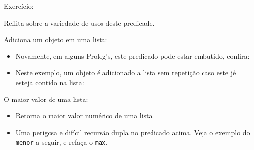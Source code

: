 \documentclass[sans]{beamer}
\begin{document}

\begin{frame}
 \begin{block}{Exercício:}

Reflita sobre a variedade de usos deste predicado.

 \end{block}
\end{frame}


\begin{frame}
\begin{block}{Adiciona um objeto em uma lista:}
\begin{itemize}
 \item Novamente, em alguns Prolog's, este predicado pode estar embutido, confira:
 \item Neste exemplo, um objeto é adicionado a lista
sem repeti\c{c}ão caso este jé
 esteja contido na lista:
\end{itemize}




\end{block}
\end{frame}

\begin{frame}
\begin{block}{O maior valor de uma lista:}
\begin{itemize}
 \item Retorna o maior valor numérico de uma lista.



 \item Uma perigosa e difícil recursão dupla no predicado acima.
Veja o exemplo do \texttt{menor} a seguir, e refaça o \texttt{max}.
\end{itemize}
\end{block}
\end{frame}
\end{document}
